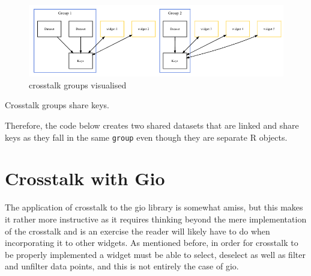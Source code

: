 \documentclass[
  10pt,
]{krantz}
\makeatletter
\newenvironment{Shaded}{\begin{snugshade}}{\end{snugshade}}
\newcommand{\DataTypeTok}[1]{\textcolor[rgb]{0.27,0.27,0.27}{#1}}
\newcommand{\KeywordTok}[1]{\textcolor[rgb]{0.27,0.27,0.27}{\textbf{#1}}}
\newcommand{\NormalTok}[1]{#1}
\newcommand{\OperatorTok}[1]{\textcolor[rgb]{0.43,0.43,0.43}{\textbf{#1}}}
\newcommand{\StringTok}[1]{\textcolor[rgb]{0.5,0.5,0.5}{#1}}
\newenvironment{kframe}{%
\medskip{}
\setlength{\fboxsep}{.8em}
 \def\at@end@of@kframe{}%
 \ifinner\ifhmode%
  \def\at@end@of@kframe{\end{minipage}}%
  \begin{minipage}{\columnwidth}%
 \fi\fi%
 \def\FrameCommand##1{\hskip\@totalleftmargin \hskip-\fboxsep
 \colorbox{shadecolor}{##1}\hskip-\fboxsep
     \hskip-\linewidth \hskip-\@totalleftmargin \hskip\columnwidth}%
 \MakeFramed {\advance\hsize-\width
   \@totalleftmargin\z@ \linewidth\hsize
   \@setminipage}}%
 {\par\unskip\endMakeFramed%
 \at@end@of@kframe}
\renewenvironment{Shaded}{\begin{kframe}}{\end{kframe}}
\newenvironment{rmdblock}[1]
  {
  \begin{itemize}
  \renewcommand{\labelitemi}{
    \raisebox{-.7\height}[0pt][0pt]{
      {\setkeys{Gin}{width=3em,keepaspectratio}\texttt{[image: images/\#1]}}
    }
  }
  \setlength{\fboxsep}{1em}
  \begin{kframe}
  \item
  }
  {
  \end{kframe}
  \end{itemize}
  }
\newenvironment{rmdnote}
  {\begin{rmdblock}{note}}
  {\end{rmdblock}}
\makeatother
\begin{document}
\begin{figure}[H]

{\centering \includegraphics[width=1\linewidth]{images/03-crosstalk-grps} 

}

\caption{crosstalk groups visualised}\label{fig:crosstalk-groups-diagram}
\end{figure}

\begin{rmdnote}
Crosstalk groups share keys.
\end{rmdnote}

Therefore, the code below creates two shared datasets that are linked and share keys as they fall in the same \texttt{group} even though they are separate R objects.

\begin{Shaded}
\end{Shaded}

\hypertarget{linking-widgets-gio}{%
\section{Crosstalk with Gio}\label{linking-widgets-gio}}

The application of crosstalk to the gio library is somewhat amiss, but this makes it rather more instructive as it requires thinking beyond the mere implementation of the crosstalk and is an exercise the reader will likely have to do when incorporating it to other widgets. As mentioned before, in order for crosstalk to be properly implemented a widget must be able to select, deselect as well as filter and unfilter data points, and this is not entirely the case of gio.
\end{document}
